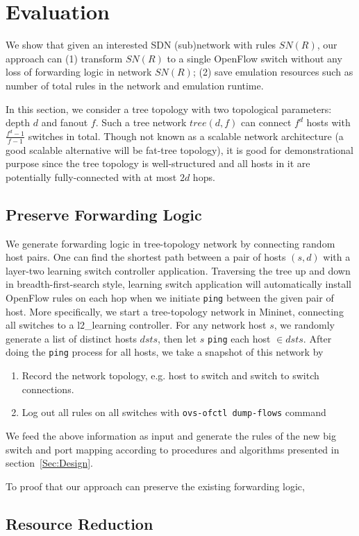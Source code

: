 \section{Evaluation}
We show that given an interested SDN (sub)network with rules $SN(R)$, our approach can 
(1) transform $SN(R)$ to a single OpenFlow switch without any loss of forwarding logic in network $SN(R)$;
(2) save emulation resources such as number of total rules in the network and emulation runtime.

In this section, we consider a tree topology with two topological parameters: depth $d$ and fanout $f$.
Such a tree network $tree(d, f)$ can connect $f^d$ hosts with $\frac{f^d - 1}{f-1}$ switches in total.
Though not known as a scalable network architecture
(a good scalable alternative will be fat-tree topology),
it is good for demonstrational purpose since the tree topology is well-structured and
all hosts in it are potentially fully-connected with at most $2d$ hops.

\subsection{Preserve Forwarding Logic}
We generate forwarding logic in tree-topology network by connecting random host pairs.
One can find the shortest path between a pair of hosts $(s, d)$ with
a layer-two learning switch controller application.
Traversing the tree up and down in breadth-first-search style, learning switch application
will automatically install OpenFlow rules on each hop when we initiate \texttt{ping} between
the given pair of host.
More specifically, we start a tree-topology network in Mininet\cite{Mininet},
connecting all switches to a l2\_learning\cite{pox} controller.
For any network host $s$, we randomly generate a list of distinct hosts $dsts$,
then let $s$ \texttt{ping} each host $\in dsts$.
After doing the \texttt{ping} process for all hosts, we take a snapshot of this network by
\begin{enumerate}
\item Record the network topology, e.g. host to switch and switch to switch connections.
\item Log out all rules on all switches with \texttt{ovs-ofctl dump-flows} command
\end{enumerate}
We feed the above information as input and generate the rules of the new big switch
and port mapping according to procedures and algorithms presented in section~\ref{Sec:Design}.

To proof that our approach can preserve the existing forwarding logic,





\subsection{Resource Reduction}

